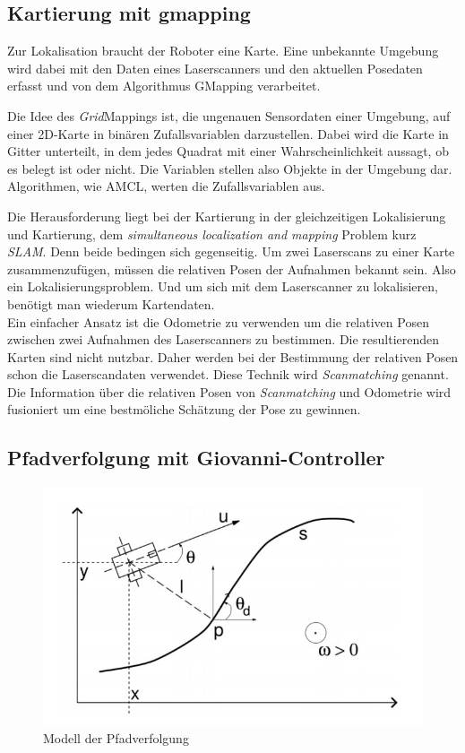 \documentclass[11pt,a4paper]{article}
\begin{document}
\subsection{Kartierung mit gmapping  \cite{Gmapping}}
{
	Zur Lokalisation braucht der Roboter eine Karte. Eine unbekannte Umgebung wird dabei mit den Daten eines Laserscanners und den aktuellen Posedaten erfasst und von dem Algorithmus GMapping verarbeitet.
	
	Die Idee des  \textit{Grid}Mappings ist, die ungenauen Sensordaten einer Umgebung, auf einer 2D-Karte in bin\"aren Zufallsvariablen darzustellen. Dabei wird die Karte in Gitter unterteilt, in dem jedes Quadrat mit einer Wahrscheinlichkeit aussagt, ob es belegt ist oder nicht. Die Variablen stellen also Objekte in der Umgebung dar. Algorithmen, wie AMCL, werten die Zufallsvariablen aus.  
	
	Die Herausforderung liegt bei der Kartierung in der gleichzeitigen Lokalisierung und Kartierung, dem \textit{simultaneous localization and mapping} Problem kurz \textit{SLAM}. Denn beide bedingen sich gegenseitig. Um  zwei Laserscans zu einer Karte zusammenzuf\"ugen, m\"ussen die relativen Posen der Aufnahmen bekannt sein. Also ein Lokalisierungsproblem. Und um sich mit dem Laserscanner zu lokalisieren, ben\"otigt man wiederum Kartendaten. \\
    
    Ein einfacher Ansatz ist die Odometrie zu verwenden um die relativen Posen zwischen zwei Aufnahmen des Laserscanners zu bestimmen. Die resultierenden Karten sind nicht nutzbar. Daher werden bei der Bestimmung der relativen Posen schon die Laserscandaten verwendet. Diese Technik wird \textit{Scanmatching} genannt. Die Information über die relativen Posen von \textit{Scanmatching} und Odometrie wird fusioniert um eine bestm\"oliche Sch\"atzung der Pose zu gewinnen.

\subsection{Pfadverfolgung mit Giovanni-Controller}


\begin{figure}[h]
	\includegraphics[width=\linewidth]{pictures/Pfadverfolgung.JPG}
	\caption{Modell der Pfadverfolgung}
\end{figure}

}
\end{document}
